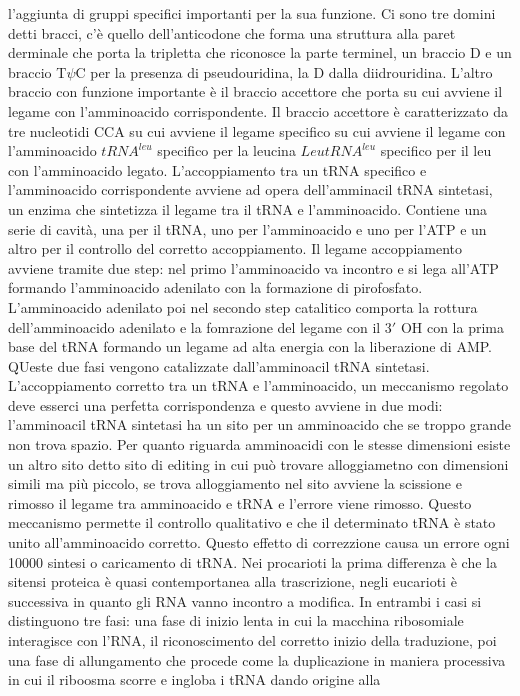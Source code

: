 l'aggiunta di gruppi specifici importanti per la sua funzione. Ci sono tre domini detti bracci, c'\`e quello dell'anticodone che forma una struttura alla paret derminale che porta la 
tripletta che riconosce la parte terminel, un braccio D e un braccio T$\psi$C per la presenza di pseudouridina, la D dalla diidrouridina. L'altro braccio con funzione importante \`e il 
braccio accettore che porta su cui avviene il legame con l'amminoacido corrispondente. Il braccio accettore \`e caratterizzato da tre nucleotidi CCA su cui avviene il legame specifico
su cui avviene il legame con l'amminoacido $tRNA^{leu}$ specifico per la leucina $LeutRNA^{leu}$ specifico per il leu con l'amminoacido legato. L'accoppiamento tra un tRNA specifico e 
l'amminoacido corrispondente avviene ad opera dell'amminacil tRNA sintetasi, un enzima che sintetizza il legame tra il tRNA e l'amminoacido. Contiene una serie di cavit\`a, una per il 
tRNA, uno per l'amminoacido e uno per l'ATP e un altro per il controllo del corretto accoppiamento. Il legame accoppiamento avviene tramite due step: nel primo l'amminoacido va incontro
e si lega all'ATP formando l'amminoacido adenilato con la formazione di pirofosfato. L'amminoacido adenilato poi nel secondo step catalitico comporta la rottura dell'amminoacido adenilato
e la fomrazione del legame con il $3'$ OH con la prima base del tRNA formando un legame ad alta energia con la liberazione di AMP. QUeste due fasi vengono catalizzate dall'amminoacil tRNA
sintetasi. L'accoppiamento corretto tra un tRNA e l'amminoacido, un meccanismo regolato deve esserci una perfetta corrispondenza e questo avviene in due modi: l'amminoacil tRNA 
sintetasi ha un sito per un amminoacido che se troppo grande non trova spazio. Per quanto riguarda amminoacidi con le stesse dimensioni esiste un altro sito detto sito di editing
in cui pu\`o trovare alloggiametno con dimensioni simili ma pi\`u piccolo, se trova alloggiamento nel sito avviene la scissione e rimosso il legame tra amminoacido e tRNA e l'errore viene
rimosso. Questo meccanismo permette il controllo qualitativo e che il determinato tRNA \`e stato unito all'amminoacido corretto. Questo effetto di correzzione causa un errore ogni 
10000 sintesi o caricamento di tRNA. Nei procarioti la prima differenza \`e che la sitensi proteica \`e quasi contemportanea alla trascrizione, negli eucarioti \`e successiva in quanto 
gli RNA vanno incontro a modifica. In entrambi i casi si distinguono tre fasi: una fase di inizio lenta in cui la macchina ribosomiale interagisce con l'RNA, il riconoscimento del 
corretto inizio della traduzione, poi una fase di allungamento che procede come la duplicazione in maniera processiva in cui il riboosma scorre e ingloba i tRNA dando origine alla
